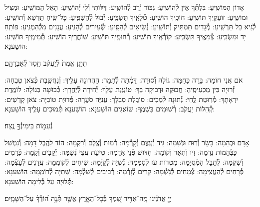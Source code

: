 \documentclass[twoside, openany, parskip=half, 11pt]{book}
\begin{document}

אָדוֹן הַמּוֹשִֽׁיעַ: בִּלְתְּ֯ךָ אֵין לְ֯הוֹשִֽׁיעַ: גִּבּוֹר וְ֯רַב לְ֯הוֹשִֽׁיע: דַּלּוֹתִי וְ֯לִי יְ֯הוֹשִֽׁיעַ: הָאֵל הַמּוֹשִֽׁיעַ: וּמַצִּיל וּמוֹשִֽׁיעַ: זוֹעֲקֶֽיךָ תּוֹשִֽׁיעַ: חוֹכֶֽיךָ הוֹשִֽׁיעַ: טְ֯לָאֶֽיךָ תַּשְׂבִּֽיעַ: יְ֯בוּל לְ֯הַשְׁפִּֽיעַ: כׇּל־שִֽׂיחַ תַּדְשֵׁא וְ֯תוֹשִֽׁיעַ: לְ֯גֵיא בַּל תַּרְשִֽׁיעַ: מְ֯גָדִים תַּמְתִּיק וְ֯תוֹשִֽׁיעַ: נְ֯שִׂיאִים לְ֯הַסִּֽיעַ: שְׂ֯עִירִים לְ֯הָנִֽיעַ: עֲנָנִים מִלְּ֯הַמְנִֽיעַ: פּוֹתֵֽחַ יָד וּמַשְׂבִּֽיעַ: צְ֯מֵאֶֽיךָ תַּשְׂבִּֽיעַ: קוֹרְ֯אֶֽיךָ תּוֹשִֽׁיעַ: רְ֯חוּמֶֽיךָ תּוֹשִֽׁיעַ:
שׁוֹחֲרֶֽיךָ הוֹשִֽׁיעַ:
תְּ֯מִימֶֽיךָ תּוֹשִֽׁיעַ: הוֹשַׁענָא:

תִּתֵּ֤ן אֱמֶת֙ לְ֯יַֽעֲקֹ֔ב חֶ֖סֶד לְ֯אַבְרָהָ֑ם׃


אֹם אֲנִי חוֹמָה: בָּרָה כַּחַמָּה: גּוֹלָה וְ֯סוּרָה: דָּמְ֯תָה לְ֯תָמָר: הַהֲרוּגָה עָלֶֽיךָ: וְ֯נֶחֱשֶֽׁבֶת כְּ֯צֹאן טִבְחָה: זְ֯רוּיָה בֵּין מַכְעִיסֶֽיהָ: חֲבוּקָה וּדְבוּקָה בָּךְ: טוֹעֶֽנֶת עֻלָּךְ: יְ֯חִידָה לְ֯יַחֲדָךְ: כְּ֯בוּשָׁה בַּגּוֹלָה: לוֹמֶֽדֶת יִרְאָתָךְ: מְ֯רֽוּטַת לֶֽחִי: נְ֯תוּנָה לְ֯מַכִים: סוֹבֶֽלֶת סִבְלָךְ: עֲנִיָּה סֹעֲרָה: פְּ֯דוּיַת טוֹבִיָּה: צֹאן קָדָשִׁים: קְ֯הִלּוֹת יַעֲקֹב: רְ֯שׁוּמִים בִּשְׁמֶֽךָ: שׁוֹאֲגִים הוֹשַׁענָא: הוֹשַׁענָא תְּ֯מוּכִים עָלֶֽיךָ הוֹשַׁענָא:

נְ֯עִמ֖וֹת בִּימִינְ֯ךָ֣ נֶֽצַח׃


אָדָם וּבְהֵמָה: בָּשָׂר וְ֯רֽוּחַ וּנְשָׁמָה: גִּיד וְ֯עֶֽצֶם וְ֯קָרְ֯מָה: דְּ֯מוּת וְ֯צֶֽלֶם וְ֯רִקְמָה: הוֹד לַהֶֽבֶל דָּמָה: וְ֯נִמְשַׁל כַּבְּ֯הֵמוֹת נִדְמָה: זִיו וְ֯תֹֽאַר וְ֯קוֹמָה: חִדּוּשׁ פְּ֯נֵי אֲדָמָה: טִיעַת עֲצֵי נְ֯שַׁמָּה: יְ֯קָבִים וְ֯קָמָה: כְּ֯רָמִים וְ֯שִׁקְמָה: לְ֯תֵבֵל הַמְ֯סֻיָּמָה: מִטְרוֹת עֹז לְ֯סַמְּ֯מָה: נְ֯שִׁיָּה לְ֯קַיְּ֯מָה: שִׂיחִים לְ֯קוֹמֲמָה: עֲדָנִים לְ֯עָצְ֯מָה: פְּ֯רָחִים לְ֯הַעֲצִֽימָה: צְ֯מָחִים לְ֯גָשְׁ֯מָה: קָרִים לְ֯זָרְ֯מָה: רְ֯בִיבִים לְ֯שַׁלְּ֯מָה:
שְׁתִיָּה לְ֯רוֹמֵֽמָה: הוֹשַׁענָא:
תְּ֯לוּיָה עַל בְּ֯לִימָה הוֹשַׁענָא:

יְיָ֤ אֲדֹנֵ֗ינוּ מָֽה־אַדִּ֣יר שִׁ֭מְךָ בְּ֯כׇל־הָאָ֑רֶץ אֲשֶׁ֥ר תְּ֯נָ֥ה ה֝וֹדְ֯ךָ֗ עַל־הַשָּׁמָֽיִם׃
\end{document}
